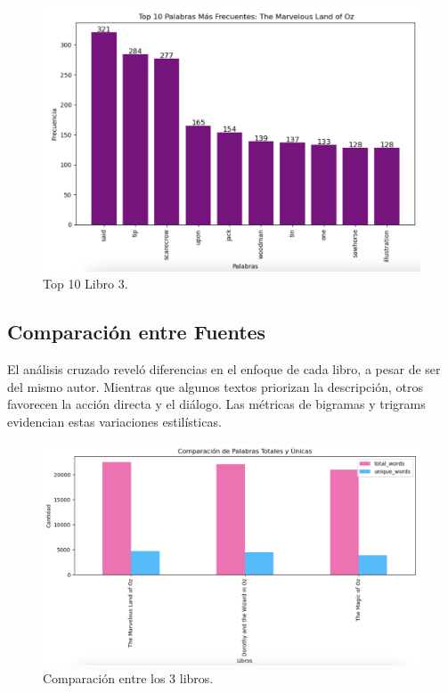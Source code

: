 \documentclass[conference]{IEEEtran}
\begin{document}
	\begin{figure}[h]
    \centering
    \includegraphics[width=0.9\linewidth]{Libro 1 Top 10 palabras más frecuentes.png}
    \caption{Top 10 Libro 3.}
    \label{fig:Libro 3 Top 10}
	\end{figure}

	\FloatBarrier


\subsection{Comparación entre Fuentes}

El análisis cruzado reveló diferencias en el enfoque de cada libro, a pesar de ser del mismo autor. Mientras que algunos textos priorizan la descripción, otros favorecen la acción directa y el diálogo. Las métricas de bigramas y trigrams evidencian estas variaciones estilísticas.


	\begin{figure}[h]
    \centering
    \includegraphics[width=0.9\linewidth]{Comparación de palabras totales y únicas.png}
    \caption{Comparación entre los 3 libros.}
    \label{fig:Comparación}
	\end{figure}
\end{document}
